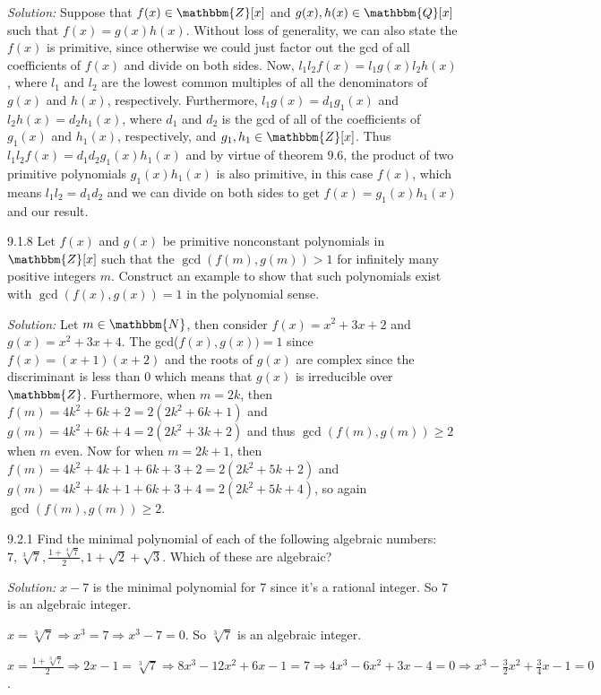 \documentclass{letter}
\newcommand{\tmem}[1]{{\em #1\/}}
\begin{document}
{\tmem{Solution:}} Suppose that $f (x) \in \mathbbm{Z}[x]$ and $g (x), h (x)
\in \mathbbm{Q}[x]$ such that $f (x) = g (x) h (x)$. Without loss of
generality, we can also state the $f (x)$ is primitive, since otherwise we
could just factor out the gcd of all coefficients of $f (x)$ and divide on
both sides. Now, $l_1 l_2 f (x) = l_1 g (x) l_2 h (x)$, where $l_1$ and $l_2$
are the lowest common multiples of all the denominators of $g (x)$ and $h
(x)$, respectively. Furthermore, $l_1 g (x) = d_1 g_1 (x)$ and $l_2 h (x) =
d_2 h_1 (x)$, where $d_1$ and $d_2$ is the gcd of all of the coefficients of
$g_1 (x)$ and $h_1 (x)$, respectively, and $g_1, h_1 \in \mathbbm{Z}[x]$. Thus
$l_1 l_2 f (x) = d_1 d_2 g_1 (x) h_1 (x)$ and by virtue of theorem 9.6, the
product of two primitive polynomials $g_1 (x) h_1 (x)$ is also primitive, in
this case $f (x)$, which means $l_1 l_2 = d_1 d_2$ and we can divide on both
sides to get $f (x) = g_1 (x) h_1 (x)$ and our result.

9.1.8 Let $f (x)$ and $g (x)$ be primitive nonconstant polynomials in
$\mathbbm{Z}[x]$ such that the $\gcd (f (m), g (m)) > 1$ for infinitely many
positive integers $m$. Construct an example to show that such polynomials
exist with $\gcd (f (x), g (x)) = 1$ in the polynomial sense.

{\tmem{Solution:}} Let $m \in \mathbbm{N}$, then consider $f (x) = x^2 + 3 x +
2$ and $g (x) = x^2 + 3 x + 4$. The gcd($f (x), g (x)) = 1$ since $f (x) = (x
+ 1) (x + 2)$ and the roots of $g (x)$ are complex since the discriminant is
less than 0 which means that $g (x)$ is irreducible over $\mathbbm{Z}$.
Furthermore, when $m = 2 k$, then $f (m) = 4 k^2 + 6 k + 2 = 2 (2 k^2 + 6 k +
1)$ and $g (m) = 4 k^2 + 6 k + 4 = 2 (2 k^2 + 3 k + 2)$ and thus $\gcd (f (m),
g (m)) \geq 2$ when $m$ even. Now for when $m = 2 k + 1$, then $f (m) = 4 k^2
+ 4 k + 1 + 6 k + 3 + 2 = 2 (2 k^2 + 5 k + 2)$ and $g (m) = 4 k^2 + 4 k + 1 +
6 k + 3 + 4 = 2 (2 k^2 + 5 k + 4)$, so again $\gcd (f (m), g (m)) \geq 2$.

9.2.1 Find the minimal polynomial of each of the following algebraic numbers:
$7, \sqrt[3]{7}, \frac{1 + \sqrt[3]{7}}{2}, 1 + \sqrt{2} + \sqrt{3}$. Which of
these are algebraic?

{\tmem{Solution:}} $x - 7$ is the minimal polynomial for 7 since it's a
rational integer. So $7$ is an algebraic integer.

$x = \sqrt[3]{7} \Rightarrow x^3 = 7 \Rightarrow x^3 - 7 = 0$. So
$\sqrt[3]{7}$ is an algebraic integer.

$x = \frac{1 + \sqrt[3]{7}}{2} \Rightarrow 2 x - 1 = \sqrt[3]{7} \Rightarrow 8
x^3 - 12 x^2 + 6 x - 1 = 7 \Rightarrow 4 x^3 - 6 x^2 + 3 x - 4 = 0 \Rightarrow
x^3 - \frac{3}{2} x^2 + \frac{3}{4} x - 1 = 0$.
\end{document}
